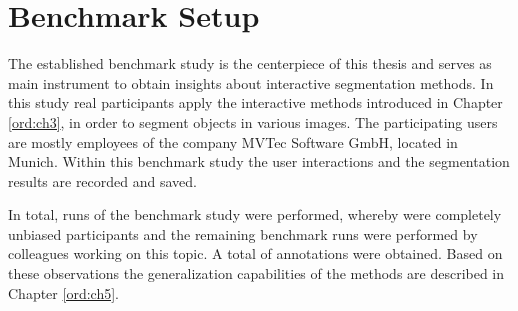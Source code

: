 
\chapter{Benchmark Setup}\label{ord:ch4}


The established benchmark study is the centerpiece of this thesis and serves as main instrument to obtain insights about interactive segmentation methods.
In this study real participants apply the interactive methods introduced in Chapter \ref{ord:ch3}, in order to segment objects in various images.
The participating users are mostly employees of the company MVTec Software GmbH, located in Munich.
Within this benchmark study the user interactions and the segmentation results are recorded and saved.

In total, \getNumberBenchmarkRuns \space runs of the benchmark study were performed, whereby \getNumberBenchmarkParticipants \space were completely unbiased participants and the remaining benchmark runs were performed by colleagues working on this topic.
A total of \getNumberBenchmarkAnnotations \space annotations were obtained.
Based on these observations the generalization capabilities of the methods are described in Chapter \ref{ord:ch5}.





